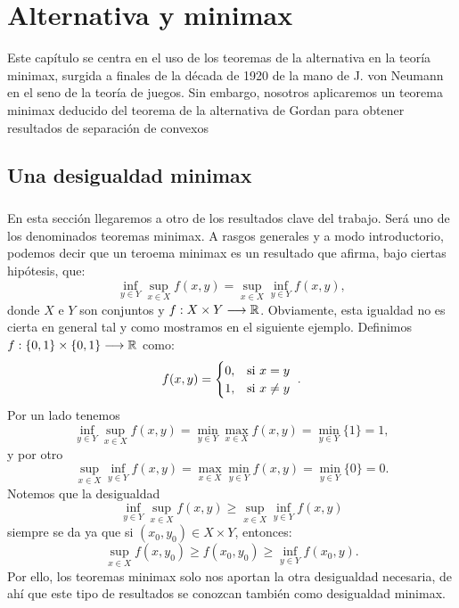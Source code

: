 \chapter{Alternativa y minimax}
\newcommand{\topSpace}{X}
\newcommand{\topSpaceY}{Y}
Este capítulo se centra en el uso de los teoremas de la alternativa en la teoría minimax, surgida a finales de la década de 1920 de la mano de J. von Neumann en el seno de la teoría de juegos. Sin embargo, nosotros aplicaremos un teorema minimax deducido del teorema de la alternativa de Gordan para obtener resultados de separación de convexos
\section{Una desigualdad minimax}
\paragraph{}En esta sección llegaremos a otro de los resultados clave del trabajo. Será uno de los denominados teoremas minimax. A rasgos generales y a modo introductorio, podemos decir que un teroema minimax es un resultado que afirma, bajo ciertas hipótesis, que:
\[
\inf_{y \in Y} \sup_{x \in X} f(x,y) = \sup_{x \in X} \inf_{y \in Y} f(x,y),
\] 
donde $ X \text{ e } Y$ son conjuntos y $ f: X \times Y \longrightarrow \mathbb{R} $. Obviamente, esta igualdad no es cierta en general tal y como mostramos en el siguiente ejemplo. Definimos $ f:\{0,1\} \times \{0,1\} \longrightarrow \mathbb{R}$ como:
\[
f(x,y) = \begin{cases}
0, & \mbox{si $ x=y $ } \\
1, & \mbox{si $ x\neq y$ }
\end{cases}.
\]
Por un lado tenemos
\[
\inf_{ y \in Y}\sup_{x \in X} f(x,y) = \min_{ y \in Y}\max_{x \in X} f(x,y) = \min_{ y \in Y}\{1\} = 1,
\]
y por otro
\[
\sup_{x \in X} \inf_{ y \in Y}f(x,y) = \max_{x \in X}\min_{ y \in Y}f(x,y) = \min_{ y \in Y}\{0\} = 0.
\]
Notemos que la desigualdad 
\[
\inf_{y \in Y} \sup_{x \in X} f(x,y) \geq \sup_{x \in X} \inf_{y \in Y} f(x,y)
\] 
siempre se da ya que si $ (x_0, y_0) \in X \times Y $, entonces:
\[
\sup_{x \in X} f(x,y_0) \geq f(x_0,y_0) \geq \inf_{y \in Y}f(x_0,y) .
\]
Por ello, los teoremas minimax solo nos aportan la otra desigualdad necesaria, de ahí que este tipo de resultados se conozcan también como desigualdad minimax. \\

